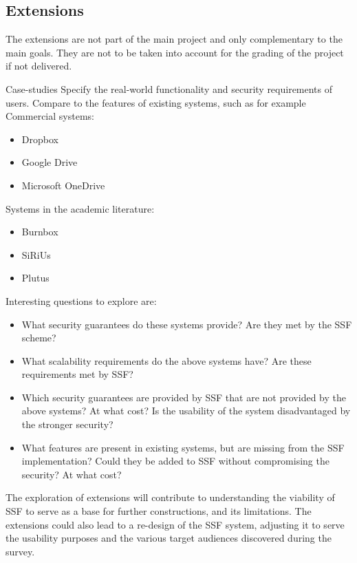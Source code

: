 \documentclass[E]{BAMASA}
\begin{document}
\subsection{Extensions}
The extensions are not part of the main project and only complementary to the main goals.
They are not to be taken into account for the grading of the project if not delivered. 

\begin{workpackage}{Case-studies}\label{wp:extension}
	Specify the real-world functionality and security requirements of users.
	Compare to the features of existing systems, such as for example\\
	Commercial systems:
    \begin{itemize}
        \item Dropbox
        \item Google Drive
        \item Microsoft OneDrive
    \end{itemize}
    Systems in the academic literature:
    \begin{itemize}
    	\item Burnbox~\cite{USENIX:TMRM18}
    	\item SiRiUs~\cite{NDSS:GSMB03}
    	\item Plutus~\cite{USENIXSAGE:KaRiSwWaFu03}
    \end{itemize}
    Interesting questions to explore are:
    \begin{itemize}
        \item What security guarantees do these systems provide?
        Are they met by the SSF scheme?
        
        \item What scalability requirements do the above systems have? Are these requirements met by SSF?
        
        \item Which security guarantees are provided by SSF that are not provided by the above systems?
        At what cost?
        Is the usability of the system disadvantaged by the stronger security?
        
        \item What features are present in existing systems, but are missing from the SSF implementation?
        Could they be added to SSF without compromising the security?
        At what cost?
    \end{itemize}
    
    The exploration of extensions will contribute to understanding the viability of SSF to serve as a base for further constructions, and its limitations.
    The extensions could also lead to a re-design of the SSF system, adjusting it to serve the usability purposes and the various target audiences discovered during the survey.
\end{workpackage}
\end{document}
